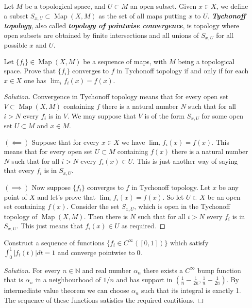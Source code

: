 \documentclass{article}
\newcommand{\N}{\mathbb{N}}
\DeclareMathOperator{\Map}{Map}
\begin{document}
\begin{defn}
	Let $M$ be a topological space, and $U \subset M$ an open subset. Given $x \in X$, we define a subset $S_{x,U} \subset \Map(X,M)$ as the set of all maps putting $x$ to $U$. \textbf{\textit{Tychonoff topology}}, also called \textbf{\textit{topology of pointwise convergence}}, is topology where open subsets are obtained by finite intersections and all unions of $S_{x,U}$ for all possible $x$ and $U$.
\end{defn}

\begin{exercise}
	Let $\{f_i\} \in \Map(X,M)$ be a sequence of maps, with $M$ being a topological space. Prove that $\{f_i\}$ converges to $f$ in Tychonoff topology if and only if for each $x \in X$ one has $\lim_i f_i(x) = f(x)$.
\end{exercise}
\begin{proof}[Solution]
	Convergence in Tychonoff topology means that for every open set $V\subset\Map(X,M)$ containing $f$ there is a natural number $N$ such that for all $i>N$ every $f_i$ is in $V$. We may suppose that $V$ is of the form $S_{x,U}$ for some open set $U\subset M$ and $x\in M$.
	
	$(\impliedby)$ Suppose that for every $x\in X$ we have $\lim_if_i(x)=f(x)$. This means that for every open set $U\subset M$ containing $f(x)$ there is a natural number $N$ such that for all $i>N$ every $f_i(x)\in U$. This is just another way of saying that every $f_i$ is in $S_{x,U}$.
	
	 $(\implies)$ Now suppose $\{f_i\}$ converges to $f$ in Tychonoff topology. Let $x$ be any point of $X$ and let's prove that $\lim_if_i(x)=f(x)$. So let $U\subset X$ be an open set containing $f(x)$. Consider the set $S_{x,U}$, which is open in the Tychonoff topology of $\Map(X,M)$. Then there is $N$ such that for all $i>N$ every $f_i$ is in $S_{x,U}$. This just means that $f_i(x)\in U$ as required.
\end{proof}

\begin{exercise}
	Construct a sequence of functions $\{f_i \in C^\infty ([0, 1])\}$ which satisfy $\int_0^1|f_i(t)|dt = 1$ and converge pointwise to 0.
\end{exercise}
\begin{proof}[Solution]
	For every $n\in\N$ and real number $\alpha_n$ there exists a $C^\infty$ bump function that is $\alpha_n$ in a neighbourhood of $1/n$ and has support in $\left(\frac{1}{n}-\frac{1}{2n},\frac{1}{n}+\frac{1}{2n}\right)$. By intermediate value theorem we can choose $\alpha_n$ such that its integral is exactly 1. The sequence of these functions satisfies the required contitions.
\end{proof}

\end{document}
